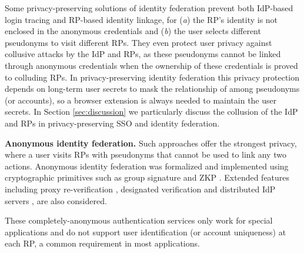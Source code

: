 Some privacy-preserving solutions of identity federation \cite{PseudoID,ELPASSO,UnlimitID,Opaak,uprov,hyperledge-idemix} prevent both IdP-based login tracing and RP-based identity linkage, for (\emph{a}) the RP's identity is not enclosed in the anonymous credentials and (\emph{b}) the user selects different pseudonyms to visit different RPs.
They even protect user privacy against collusive attacks by the IdP and RPs, as these pseudonyms cannot be linked through anonymous credentials \cite{anon-credential-2001, idemix, anon-credential} when the ownership of these credentials is proved to colluding RPs. %
In privacy-preserving identity federation
this privacy protection depends on long-term user secrets to mask the relationship of among pseudonyms (or accounts),
        so a browser extension is always needed to maintain the user secrets. 
In Section \ref{sec:discussion}
we particularly discuss the collusion of the IdP and RPs in privacy-preserving SSO and identity federation.

%

\noindent\textbf{Anonymous identity federation.}
Such approaches offer the strongest privacy,
    where a user visits RPs with pseudonyms that cannot be used to link any two actions.
Anonymous identity federation was formalized \cite{WangWS13} and implemented using cryptographic primitives such as group signature and ZKP \cite{WangWS13, HanCSTWW20, HanCSTW18}.
Extended features including proxy re-verification \cite{HanCSTWW20}, designated verification \cite{HanCSTW18} and distributed IdP servers \cite{TSAPP}, are also considered. 

These completely-anonymous authentication services only work for special applications and do not support user identification (or account uniqueness) at each RP, a common requirement in most applications.

